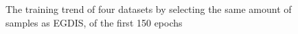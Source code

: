 \begin{figure}[H]
\centering  
{}
\caption{The training trend of four datasets by selecting the same amount of samples as EGDIS, of the first 150 epochs}
\label{Fig.training_trend}
\end{figure}